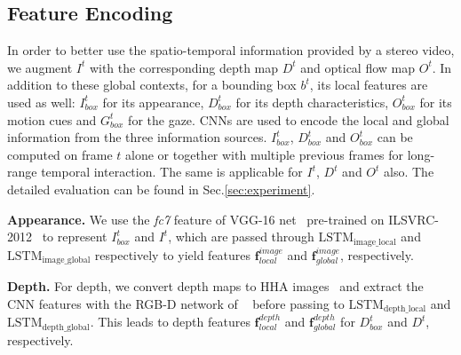 \documentclass[10pt,twocolumn,letterpaper]{article}
\newcommand{\model}[2]{$\text{#1}_{\text{#2}}$}
\newcommand{\vect}[1]{{\mathbf #1}}
\begin{document}

\subsection{Feature Encoding}
\label{sec:featureencod} 
In order to better use the spatio-temporal information provided by a stereo video, we augment $I^t$ with the corresponding depth map $D^t$ and optical flow map $O^t$. In addition to these global contexts, for a bounding box $b^t$, its local features are used as well: $I_{box}^t$ for its appearance, $D_{box}^t$ for its depth characteristics, $O_{box}^t$ for its motion cues and $G_{box}^t$ for the gaze. CNNs are used to encode the local and global information from the three information sources. $I_{box}^t$, $D_{box}^t$ and $O_{box}^t$ can be computed on frame $t$ alone or together with multiple previous frames for long-range temporal interaction. The same is applicable for $I^t$, $D^t$ and $O^t$ also. The detailed evaluation can be found in Sec.\ref{sec:experiment}.  

\noindent \textbf{Appearance.}
We use the \emph{fc7} feature of VGG-16 net~\cite{vgg16} pre-trained on ILSVRC-2012~\cite{imagenet:2015} to represent $I_{box}^t$ and $I^t$, which are passed through \model{LSTM}{image\_local} and \model{LSTM}{image\_global} respectively to yield features $\vect{f}_{local}^{image}$ and $\vect{f}_{global}^{image}$, respectively.

\noindent \textbf{Depth.}
For depth, we convert depth maps to HHA images~\cite{rgbd:net:eccv14} and extract the CNN features with the RGB-D network of ~\cite{rgbd:net:eccv14} before passing to \model{LSTM}{depth\_local} and \model{LSTM}{depth\_global}. This leads to  depth features $\vect{f}_{local}^{depth}$ and $\vect{f}_{global}^{depth}$ for $D_{box}^t$ and $D^t$, respectively. 
\end{document}

